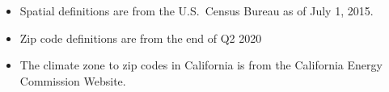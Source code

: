 \begin{itemize}
\item Spatial definitions are from the U.S.~Census Bureau as of July 1, 2015.
\item Zip code definitions are from the end of Q2 2020
\item The climate zone to zip codes in California is from the California Energy Commission Website.
\end{itemize}
